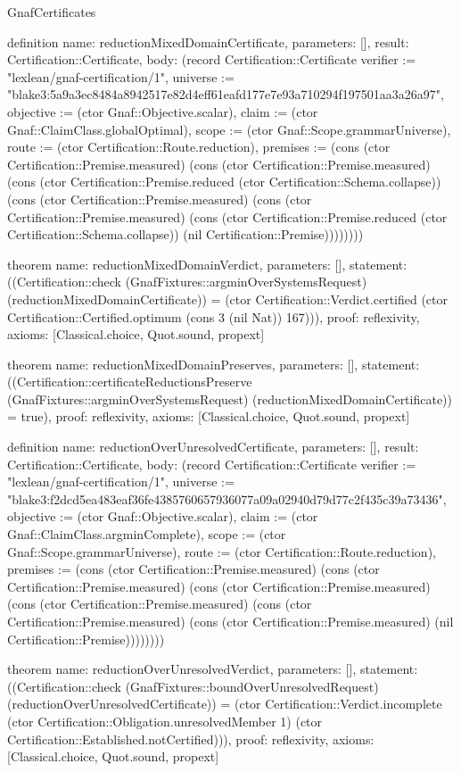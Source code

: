 \begin{lexlean}{GnafCertificates}
\begin{semanticmodule}
definition{
  name: reductionMixedDomainCertificate,
  parameters: [],
  result: Certification::Certificate,
  body: (record Certification::Certificate {verifier := "lexlean/gnaf-certification/1", universe := "blake3:5a9a3ec8484a8942517e82d4eff61eafd177e7e93a710294f197501aa3a26a97", objective := (ctor Gnaf::Objective.scalar), claim := (ctor Gnaf::ClaimClass.globalOptimal), scope := (ctor Gnaf::Scope.grammarUniverse), route := (ctor Certification::Route.reduction), premises := (cons (ctor Certification::Premise.measured) (cons (ctor Certification::Premise.measured) (cons (ctor Certification::Premise.reduced (ctor Certification::Schema.collapse)) (cons (ctor Certification::Premise.measured) (cons (ctor Certification::Premise.measured) (cons (ctor Certification::Premise.reduced (ctor Certification::Schema.collapse)) (nil Certification::Premise)))))))})
}

theorem{
  name: reductionMixedDomainVerdict,
  parameters: [],
  statement: ((Certification::check (GnafFixtures::argminOverSystemsRequest) (reductionMixedDomainCertificate)) = (ctor Certification::Verdict.certified (ctor Certification::Certified.optimum (cons 3 (nil Nat)) 167))),
  proof: reflexivity{},
  axioms: [Classical.choice, Quot.sound, propext]
}

theorem{
  name: reductionMixedDomainPreserves,
  parameters: [],
  statement: ((Certification::certificateReductionsPreserve (GnafFixtures::argminOverSystemsRequest) (reductionMixedDomainCertificate)) = true),
  proof: reflexivity{},
  axioms: [Classical.choice, Quot.sound, propext]
}

definition{
  name: reductionOverUnresolvedCertificate,
  parameters: [],
  result: Certification::Certificate,
  body: (record Certification::Certificate {verifier := "lexlean/gnaf-certification/1", universe := "blake3:f2dcd5ea483eaf36fe4385760657936077a09a02940d79d77c2f435c39a73436", objective := (ctor Gnaf::Objective.scalar), claim := (ctor Gnaf::ClaimClass.argminComplete), scope := (ctor Gnaf::Scope.grammarUniverse), route := (ctor Certification::Route.reduction), premises := (cons (ctor Certification::Premise.measured) (cons (ctor Certification::Premise.measured) (cons (ctor Certification::Premise.measured) (cons (ctor Certification::Premise.measured) (cons (ctor Certification::Premise.measured) (cons (ctor Certification::Premise.measured) (nil Certification::Premise)))))))})
}

theorem{
  name: reductionOverUnresolvedVerdict,
  parameters: [],
  statement: ((Certification::check (GnafFixtures::boundOverUnresolvedRequest) (reductionOverUnresolvedCertificate)) = (ctor Certification::Verdict.incomplete (ctor Certification::Obligation.unresolvedMember 1) (ctor Certification::Established.notCertified))),
  proof: reflexivity{},
  axioms: [Classical.choice, Quot.sound, propext]
}


\end{semanticmodule}
\end{lexlean}
